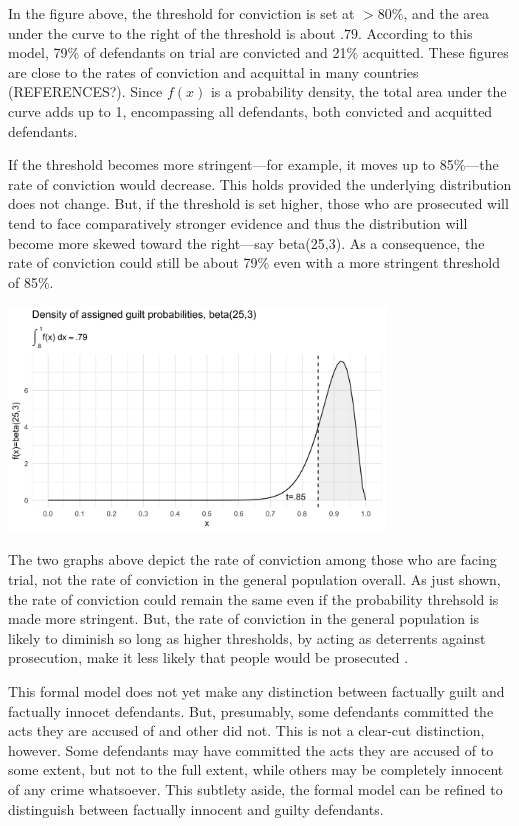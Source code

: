 \documentclass[10pt,dvipsnames,enabledeprecatedfontcommands]{scrartcl}
\begin{document}
In the figure above, the threshold for conviction is set at \(>80\%\),
and the area under the curve to the right of the threshold is about
\(.79\). According to this model, 79\% of defendants on trial are
convicted and 21\% acquitted. These figures are close to the rates of
conviction and acquittal in many countries (REFERENCES?). Since \(f(x)\)
is a probability density, the total area under the curve adds up to 1,
encompassing all defendants, both convicted and acquitted defendants.

If the threshold becomes more stringent---for example, it moves up to
85\%---the rate of conviction would decrease. This holds provided the
underlying distribution does not change. But, if the threshold is set
higher, those who are prosecuted will tend to face comparatively
stronger evidence and thus the distribution will become more skewed
toward the right---say \textsf{beta(25,3)}. As a consequence, the rate
of conviction could still be about 79\% even with a more stringent
threshold of 85\%.

\begin{center}
    \includegraphics[width=10cm]{dbeta(25,3)2.png}
\end{center}

The two graphs above depict the rate of conviction among those who are
facing trial, not the rate of conviction in the general population
overall. As just shown, the rate of conviction could remain the same
even if the probability threhsold is made more stringent. But, the rate
of conviction in the general population is likely to diminish so long as
higher thresholds, by acting as deterrents against prosecution, make it
less likely that people would be prosecuted .

This formal model does not yet make any distinction between factually
guilt and factually innocet defendants. But, presumably, some defendants
committed the acts they are accused of and other did not. This is not a
clear-cut distinction, however. Some defendants may have committed the
acts they are accused of to some extent, but not to the full extent,
while others may be completely innocent of any crime whatsoever. This
subtlety aside, the formal model can be refined to distinguish between
factually innocent and guilty defendants.
\end{document}
